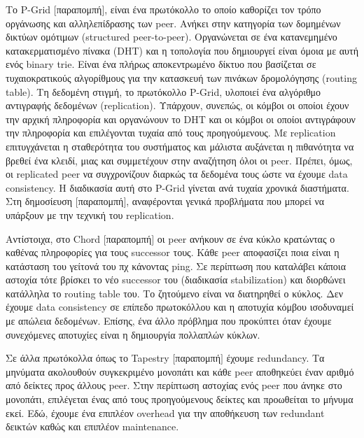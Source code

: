 Το P-Grid $[$παραπομπή$]$, είναι ένα πρωτόκολλο το οποίο καθορίζει τον 
τρόπο οργάνωσης και αλληλεπίδρασης των peer. Ανήκει στην κατηγορία των 
δομημένων δικτύων ομότιμων (structured peer-to-peer). Οργανώνεται σε ένα 
κατανεμημένο κατακερματισμένο πίνακα (DHT) και η τοπολογία που 
δημιουργεί είναι όμοια με αυτή ενός binary trie. Είναι ένα πλήρως 
αποκεντρωμένο δίκτυο που βασίζεται σε τυχαιοκρατικούς αλγορίθμους για 
την κατασκευή των πινάκων δρομολόγησης (routing table). Τη δεδομένη 
στιγμή, το πρωτόκολλο P-Grid, υλοποιεί ένα αλγόριθμο αντιγραφής 
δεδομένων (replication). Υπάρχουν, συνεπώς, οι κόμβοι οι οποίοι έχουν 
την αρχική πληροφορία και οργανώνουν το DHT και οι κόμβοι οι οποίοι 
αντιγράφουν την πληροφορία και επιλέγονται τυχαία από τους 
προηγούμενους. Με replication επιτυγχάνεται η σταθερότητα του συστήματος 
και μάλιστα αυξάνεται η πιθανότητα να βρεθεί ένα κλειδί, μιας και 
συμμετέχουν στην αναζήτηση όλοι οι peer. Πρέπει, όμως, οι replicated 
peer να συγχρονίζουν διαρκώς τα δεδομένα τους ώστε να έχουμε data 
consistency. Η διαδικασία αυτή στο P-Grid γίνεται ανά τυχαία χρονικά 
διαστήματα. Στη δημοσίευση $[$παραπομπή$]$, αναφέρονται γενικά 
προβλήματα που μπορεί να υπάρξουν με την τεχνική του replication.

Αντίστοιχα, στο Chord $[$παραπομπή$]$ οι peer ανήκουν σε ένα κύκλο 
κρατώντας ο καθένας πληροφορίες για τους successor τους. Κάθε peer 
αποφασίζει ποια είναι η κατάσταση του γείτονά του πχ κάνοντας ping. Σε 
περίπτωση που καταλάβει κάποια αστοχία τότε βρίσκει το νέο successor του 
(διαδικασία stabilization) και διορθώνει κατάλληλα το routing table του. 
Το ζητούμενο είναι να διατηρηθεί ο κύκλος. Δεν έχουμε data consistency 
σε επίπεδο πρωτοκόλλου και η αποτυχία κόμβου ισοδυναμεί με απώλεια 
δεδομένων. Επίσης, ένα άλλο πρόβλημα που προκύπτει όταν έχουμε 
συνεχόμενες αποτυχίες είναι η δημιουργία πολλαπλών κύκλων.

 Σε άλλα πρωτόκολλα όπως το Tapestry $[$παραπομπή$]$ έχουμε redundancy. 
Τα μηνύματα ακολουθούν συγκεκριμένο μονοπάτι και κάθε peer αποθηκεύει 
έναν αριθμό από δείκτες προς άλλους peer. Στην περίπτωση αστοχίας ενός 
peer που άνηκε στο μονοπάτι, επιλέγεται ένας από τους προηγούμενους 
δείκτες και προωθείται το μήνυμα εκεί. Εδώ, έχουμε ένα επιπλέον overhead 
για την αποθήκευση των redundant δεικτών καθώς και επιπλέον maintenance.
